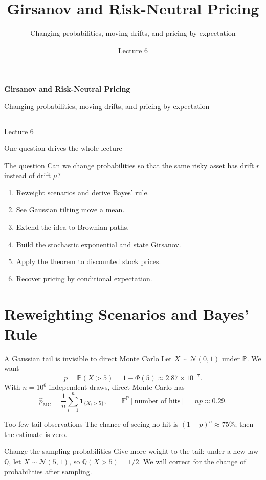 \documentclass[handout,10pt,aspectratio=169]{beamer}
\title{Girsanov and Risk-Neutral Pricing}
\subtitle{Changing probabilities, moving drifts, and pricing by expectation}
\author{}
\date{Lecture 6}
\newcommand{\E}{\mathbb E}
\newcommand{\Pp}{\mathbb P}
\newcommand{\Q}{\mathbb Q}
\newcommand{\1}{\mathbf 1}
\newcommand{\Nlaw}{\mathcal N}
\begin{document}
\begin{frame}[plain]
  \vfill
  {\LARGE\bfseries\color{CourseBlue}Girsanov and Risk-Neutral Pricing\par}
  \medskip
  {\large Changing probabilities, moving drifts, and pricing by expectation\par}
  \medskip
  {\color{CourseGold}\rule{0.94\textwidth}{0.8pt}}
  \medskip
  {Lecture 6\par}
  \vfill
\end{frame}

\begin{frame}{One question drives the whole lecture}
\begin{block}{The question}
Can we change probabilities so that the same risky asset has drift \(r\)
instead of drift \(\mu\)?
\end{block}
\begin{enumerate}
  \item Reweight scenarios and derive Bayes' rule.
  \item See Gaussian tilting move a mean.
  \item Extend the idea to Brownian paths.
  \item Build the stochastic exponential and state Girsanov.
  \item Apply the theorem to discounted stock prices.
  \item Recover pricing by conditional expectation.
\end{enumerate}
\end{frame}

\section{Reweighting Scenarios and Bayes' Rule}

\begin{frame}{A Gaussian tail is invisible to direct Monte Carlo}
Let \(X\sim\Nlaw(0,1)\) under \(\Pp\). We want
\[
p=\Pp(X>5)=1-\Phi(5)\approx 2.87\times10^{-7}.
\]
With \(n=10^6\) independent draws, direct Monte Carlo has
\[
\widehat p_{\mathrm{MC}}=\frac1n\sum_{i=1}^n\1_{\{X_i>5\}},
\qquad \E^\Pp[\text{number of hits}]=np\approx0.29.
\]
\begin{alertblock}{Too few tail observations}
The chance of seeing no hit is \((1-p)^n\approx75\%\); then the estimate is zero.
\end{alertblock}
\begin{exampleblock}{Change the sampling probabilities}
Give more weight to the tail: under a new law \(\Q\), let
\(X\sim\Nlaw(5,1)\), so \(\Q(X>5)=1/2\). We will correct for the change
of probabilities after sampling.
\end{exampleblock}
\end{frame}
\end{document}
